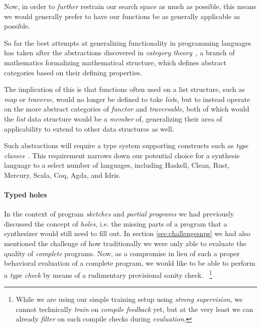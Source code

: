 \documentclass{article}
\begin{document}
Now, in order to \emph{further} restrain our search space as much as possible,
this means we would generally prefer to have our functions be as generally applicable as possible.

So far the best attempts at generalizing functionality in programming languages has taken after the abstractions discovered in \emph{category theory}~\citep{eilenberg1945general,awodey2010category},
a branch of mathematics 
formalizing mathematical structure,
which defines abstract categories based on their defining properties.

The implication of this is that functions often used on a list structure,
such as \emph{map} or \emph{traverse},
would no longer be defined to take \emph{list}s,
but to instead operate on the more abstract categories of \emph{functor} and \emph{traversable},
both of which would the \emph{list} data structure would be a \emph{member} of,
generalizing their area of applicability to extend to other data structures as well.

Such abstractions will require a type system supporting constructs such as \emph{type classes}~\citep{blott1991type}.
This requirement narrows down our potential choice for a synthesis language to a select number of languages,
including Haskell, Clean, Rust, Mercury, Scala, Coq, Agda, and Idris.

\paragraph{Typed holes} \label{sec:holes}

In the context of program \emph{sketches} and \emph{partial programs} we had previously discussed the concept of \emph{holes},
i.e. the missing parts of a program that a synthesizer would still need to fill out.
In section \ref{sec:challengesnps} we had also mentioned the challenge of how traditionally we were only able to evaluate the quality of \emph{complete} programs.
Now, as a compromise in lieu of such a proper behavioral evaluation of a complete program,
we would like to be able to perform a \emph{type check} by means of a rudimentary provisional sanity check.%
~\footnote{
    While we are using our simple training setup using \emph{strong supervision},
    we cannot technically \emph{train} on \emph{compile feedback} yet,
    but at the very least we can already \emph{filter} on such compile checks during \emph{evaluation}.
}
\end{document}

